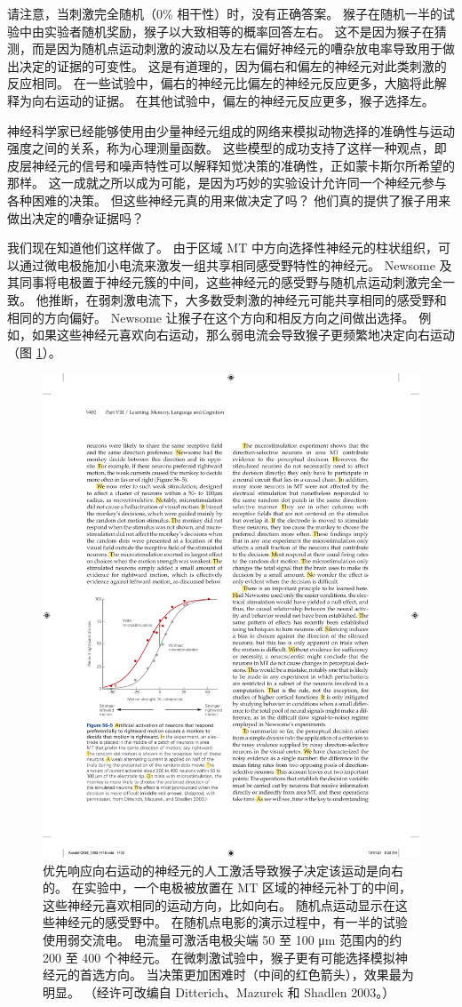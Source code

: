 请注意，当刺激完全随机（0\% 相干性）时，没有正确答案。
猴子在随机一半的试验中由实验者随机奖励，猴子以大致相等的概率回答左右。
这不是因为猴子在猜测，而是因为随机点运动刺激的波动以及左右偏好神经元的嘈杂放电率导致用于做出决定的证据的可变性。
这是有道理的，因为偏右和偏左的神经元对此类刺激的反应相同。
在一些试验中，偏右的神经元比偏左的神经元反应更多，大脑将此解释为向右运动的证据。
在其他试验中，偏左的神经元反应更多，猴子选择左。


神经科学家已经能够使用由少量神经元组成的网络来模拟动物选择的准确性与运动强度之间的关系，称为心理测量函数。
这些模型的成功支持了这样一种观点，即皮层神经元的信号和噪声特性可以解释知觉决策的准确性，正如蒙卡斯尔所希望的那样。
这一成就之所以成为可能，是因为巧妙的实验设计允许同一个神经元参与各种困难的决策。
但这些神经元真的用来做决定了吗？
他们真的提供了猴子用来做出决定的嘈杂证据吗？


我们现在知道他们这样做了。
由于区域 MT 中方向选择性神经元的柱状组织，可以通过微电极施加小电流来激发一组共享相同感受野特性的神经元。
Newsome 及其同事将电极置于神经元簇的中间，这些神经元的感受野与随机点运动刺激完全一致。
他推断，在弱刺激电流下，大多数受刺激的神经元可能共享相同的感受野和相同的方向偏好。
Newsome 让猴子在这个方向和相反方向之间做出选择。
例如，如果这些神经元喜欢向右运动，那么弱电流会导致猴子更频繁地决定向右运动（图 \ref{fig:56_5}）。


\begin{figure}[htbp]
	\centering
	\includegraphics[width=0.5\linewidth]{chap56/fig_56_5}
	\caption{优先响应向右运动的神经元的人工激活导致猴子决定该运动是向右的。 在实验中，一个电极被放置在 MT 区域的神经元补丁的中间，这些神经元喜欢相同的运动方向，比如向右。 随机点运动显示在这些神经元的感受野中。 在随机点电影的演示过程中，有一半的试验使用弱交流电。 电流量可激活电极尖端 50 至 100 μm 范围内的约 200 至 400 个神经元。 在微刺激试验中，猴子更有可能选择模拟神经元的首选方向。 当决策更加困难时（中间的红色箭头），效果最为明显。 （经许可改编自 Ditterich、Mazurek 和 Shadlen 2003。）}
	\label{fig:56_5}
\end{figure}


